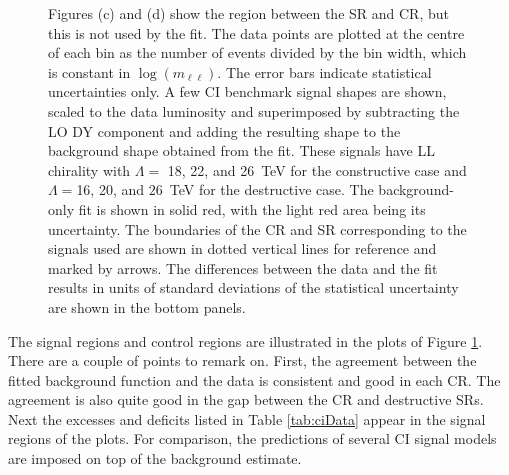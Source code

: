 {\begin{figure}[h!]
{Figures (c) and (d) show the region between the SR and CR, but this is not used by the fit.
The data points are plotted at the centre of each bin as the number of events divided by the bin width, which is constant in $\log{(m_{\ell\ell})}$.
The error bars indicate statistical uncertainties only.
A few CI benchmark signal shapes are shown, scaled to the data luminosity and superimposed by subtracting the LO DY component and adding the resulting shape to the background shape obtained from the fit.
These signals have LL chirality with $\Lambda=$ 18, 22, and 26~TeV for the constructive case and $\Lambda=$16, 20, and $26$~TeV for the destructive case.
The background-only fit is shown in solid red, with the light red area being its uncertainty.
The boundaries of the CR and SR corresponding to the signals used are shown in dotted vertical lines for reference and marked by arrows.
The differences between the data and the fit results in units of standard deviations of the statistical uncertainty are shown in the bottom panels.
}
\label{fig:ciDist}
\end{figure}
\clearpage
}

The signal regions and control regions are illustrated in the plots of Figure \ref{fig:ciDist}.
There are a couple of points to remark on.
First, the agreement between the fitted background function and the data is consistent and good in each CR.
The agreement is also quite good in the gap between the CR and destructive SRs.
Next the excesses and deficits listed in Table \ref{tab:ciData} appear in the signal regions of the plots.
For comparison, the predictions of several CI signal models are imposed on top of the background estimate.

